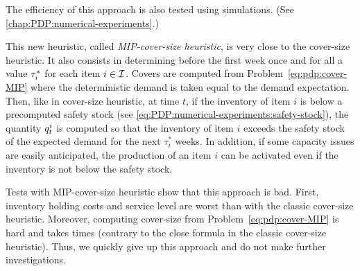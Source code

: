 The efficiency of this approach is also tested using simulations. (See \cref{chap:PDP:numerical-experiments}.)


This new heuristic, called \emph{MIP-cover-size heuristic}, is very close to the cover-size heuristic.
It also consists in determining before the first week once and for all a value $\tau_i^*$ for each item $i\in\mathcal{I}$.
Covers are computed from Problem~\eqref{eq:pdp:cover-MIP} where the deterministic demand is taken equal to the demand expectation.
Then, like in cover-size heuristic, at time $t$, if the inventory of item $i$ is below a precomputed safety stock (see \cref{eq:PDP:numerical-experiments:safety-stock}), the quantity $q_t^i$ is computed so that the inventory of item $i$ exceeds the safety stock of the expected demand for the next $\tau_i^*$ weeks.
In addition, if some capacity issues are easily anticipated, the production of an item $i$ can be activated even if the inventory is not below the safety stock.


Tests with MIP-cover-size heuristic show that this approach is bad.
First, inventory holding costs and service level are worst than with the classic cover-size heuristic.
Moreover, computing cover-size from Problem~\eqref{eq:pdp:cover-MIP} is hard and takes times (contrary to the close formula in the classic cover-size heuristic).
Thus, we quickly give up this approach and do not make further investigations.

